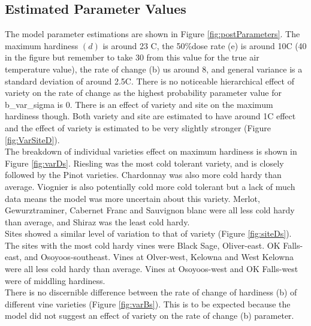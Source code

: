 \documentclass[11pt,letter]{article}
\begin{document}
\subsection{Estimated Parameter Values}
The model parameter estimations are shown in Figure \ref{fig:postParameters}. The maximum hardiness $(d)$ is around 23 \textdegree C, the 50\%dose rate (e) is around 10\textdegree C (40 in the figure but remember to take 30 from this value for the true air temperature value), the rate of change (b) us around 8, and general variance is a standard deviation of around 2.5\textdegree C. There is no noticeable hierarchical effect of variety on the rate of change as the highest probability parameter value for b\_var\_sigma is 0. There is an effect of variety and site on the maximum hardiness though. Both variety and site are estimated to have around 1\textdegree C effect and the effect of variety is estimated to be very slightly stronger (Figure \ref{fig:VarSiteD}). \\
The breakdown of individual varieties effect on maximum hardiness is shown in Figure \ref{fig:varDs}. Riesling was the most cold tolerant variety, and is closely followed by the Pinot varieties. Chardonnay was also more cold hardy than average. Viognier is also potentially cold more cold tolerant but a lack of much data means the model was more uncertain about this variety. Merlot, Gewurztraminer, Cabernet Franc and Sauvignon blanc were all less cold hardy than average, and Shiraz was the least cold hardy.  \\
Sites showed a similar level of variation to that of variety (Figure \ref{fig:siteDs}). The sites with the most cold hardy vines were Black Sage, Oliver-east. OK Falls-east, and Osoyoos-southeast. Vines at Olver-west, Kelowna and West Kelowna were all less cold hardy than average. Vines at Osoyoos-west and OK Falls-west were of middling hardiness. \\
There is no discernible difference between the rate of change of hardiness (b) of different vine varieties (Figure \ref{fig:varBs}). This is to be expected because the model did not suggest an effect of variety on the rate of change (b) parameter.
\end{document}
